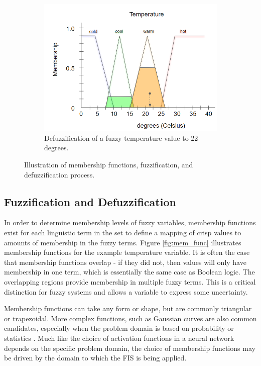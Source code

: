 \documentclass[12pt]{report}
\begin{document}
\begin{figure}
    \begin{subfigure}{.5\linewidth}
        \includegraphics[width=\linewidth]{figure/defuzzification.png}
        \caption{Defuzzification of a fuzzy temperature value to 22 degrees.}
        \label{fig:defuzzification}
    \end{subfigure}
    \caption{Illustration of membership functions, fuzzification, and defuzzification process.}
    \label{fig:mem_fuzz_defuzz}
\end{figure}


\subsection{Fuzzification and Defuzzification}

In order to determine membership levels of fuzzy variables, membership functions exist for each linguistic term in the set to define a mapping of crisp values to amounts of membership in the fuzzy terms. Figure \ref{fig:mem_func} illustrates membership functions for the example temperature variable. It is often the case that membership functions overlap - if they did not, then values will only have membership in one term, which is essentially the same case as Boolean logic. The overlapping regions provide membership in multiple fuzzy terms. This is a critical distinction for fuzzy systems and allows a variable to express some uncertainty.

Membership functions can take any form or shape, but are commonly triangular or trapezoidal. More complex functions, such as Gaussian curves are also common candidates, especially when the problem domain is based on probability or statistics \cite{Ali2015ComparisonPerformance}. Much like the choice of activation functions in a neural network depends on the specific problem domain, the choice of membership functions may be driven by the domain to which the FIS is being applied.
\end{document}
